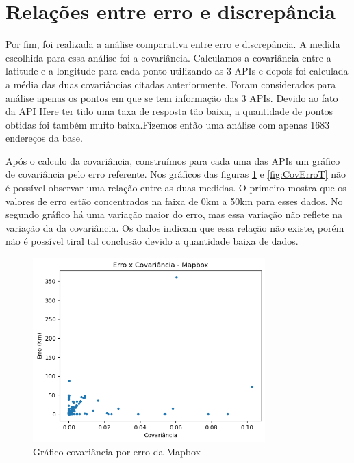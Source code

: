 \section{Relações entre erro e discrepância}
Por fim, foi realizada a análise comparativa entre erro e discrepância. A medida escolhida para essa análise foi a covariância. Calculamos a covariância entre a latitude e a longitude para cada ponto utilizando as 3 APIs e depois foi calculada a média das duas covariâncias citadas anteriormente. Foram considerados para análise apenas os pontos em que se tem informação das 3 APIs. Devido ao fato da API Here ter tido uma taxa de resposta tão baixa, a quantidade de pontos obtidas foi também muito baixa.Fizemos então uma análise com apenas 1683 endereços da base. 

Após o calculo da covariância, construímos para cada uma das APIs um gráfico de covariância pelo erro referente. Nos gráficos das figuras \ref{fig:CovErroM} e \ref{fig:CovErroT} não é possível observar uma relação entre as duas medidas. O primeiro mostra que os valores de erro estão concentrados na faixa de 0km a 50km para esses dados. No segundo gráfico há uma variação maior do erro, mas essa variação não reflete na variação da da covariância. Os dados indicam que essa relação não existe, porém não é possível tiral tal conclusão devido a quantidade baixa de dados. 

\begin{figure}[h]
  \centering
  \includegraphics[width=0.8\textwidth]{Figuras/ErroCovM.png}
  \caption{Gráfico covariância por erro da Mapbox}
  \label{fig:CovErroM}
\end{figure}


